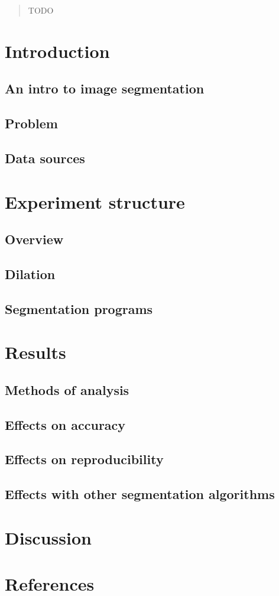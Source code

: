 \documentclass[12pt,a4paper]{article}
\begin{document}
\begin{abstract}
TODO

\end{abstract}

\section{Introduction}

\subsection{An intro to image segmentation}

\subsection{Problem}

\subsection{Data sources}

\section{Experiment structure}

\subsection{Overview}

\subsection{Dilation}

\subsection{Segmentation programs}

\section{Results}

\subsection{Methods of analysis}

\subsection{Effects on accuracy}

\subsection{Effects on reproducibility}

\subsection{Effects with other segmentation algorithms}

\section{Discussion}

\section{References}
\end{document}

